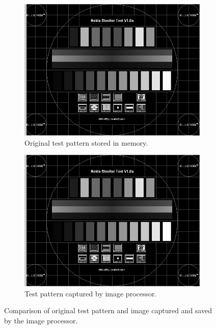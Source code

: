 \begin{figure}
\centering
\begin{subfigure}{.5\textwidth}
  \centering
  \includegraphics[width=1\textwidth]{./img/ov7670_test_pattern_capture.png}
  \caption{Original test pattern stored in memory.}
\end{subfigure}%
\begin{subfigure}{.5\textwidth}
  \centering
  \includegraphics[width=1\textwidth]{./img/ov7670_test_pattern_capture.png}
  \caption{Test pattern captured by image processor.}
\end{subfigure}
\caption{Comparison of original test pattern and image captured and saved by the image processor.}
\label{fig:test_pattern_capture}
\end{figure}

